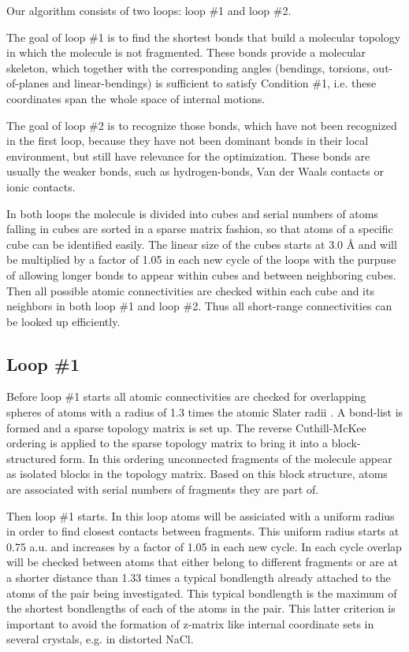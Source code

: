 \documentclass[prl,aps,preprint,superbib,12pt]{revtex4}
\begin{document}
Our algorithm consists of two loops: loop \#1 and loop \#2.

The goal of loop \#1 is to find the shortest bonds
that build a molecular topology in which the molecule is not 
fragmented. These bonds provide a molecular skeleton, which together
with the corresponding angles (bendings, torsions, out-of-planes and 
linear-bendings) is sufficient to satisfy Condition \#1, i.e.
these coordinates span the whole space of internal motions. 

The goal of loop \#2 is to recognize those bonds, which 
have not been recognized in the first loop, because they have not been
dominant bonds in their local environment, but still have relevance
for the optimization. These bonds are usually the weaker bonds,
such as hydrogen-bonds, Van der Waals contacts or ionic
contacts.

In both loops the molecule is divided into cubes and
serial numbers of atoms falling in cubes are sorted in a sparse matrix
fashion, so that atoms of a specific cube can be identified easily. 
The linear size of the cubes starts at 3.0 \AA
and will be multiplied by a factor of 1.05 in each new cycle of the 
loops
with the purpuse of allowing longer bonds to appear within cubes and 
between neighboring cubes.
Then all possible atomic connectivities are checked within each cube 
and its neighbors in both loop \#1 and loop \#2. Thus all short-range
connectivities can be looked up efficiently.

\subsection{Loop \#1}
Before loop \#1 starts all atomic connectivities are checked for 
overlapping spheres of atoms with a radius of 1.3 times the atomic
Slater radii \cite{Slater_64v41}. 
A bond-list is formed and a sparse topology matrix is set up.
The reverse Cuthill-McKee ordering \cite{AGeorge81} is applied
to the sparse topology matrix to bring it
into a block-structured form. In this ordering unconnected 
fragments of the molecule appear as isolated blocks in the 
topology matrix. Based on this block structure, atoms are associated
with serial numbers of fragments they are part of.

Then loop \#1 starts.
In this loop atoms will be assiciated with a uniform radius
in order to find closest contacts between fragments.
This uniform radius starts at 0.75 a.u. and 
increases by a factor of 1.05 in each new cycle.
In each cycle overlap will be checked between atoms that
either belong to different fragments or are at a shorter distance
than 1.33 times a typical bondlength already attached to the
atoms of the pair being investigated. This typical bondlength
is the maximum of the shortest bondlengths of each of the atoms 
in the pair.
This latter criterion is important to avoid the formation of 
z-matrix like internal coordinate sets in several crystals, e.g.
in distorted NaCl.
\end{document}
